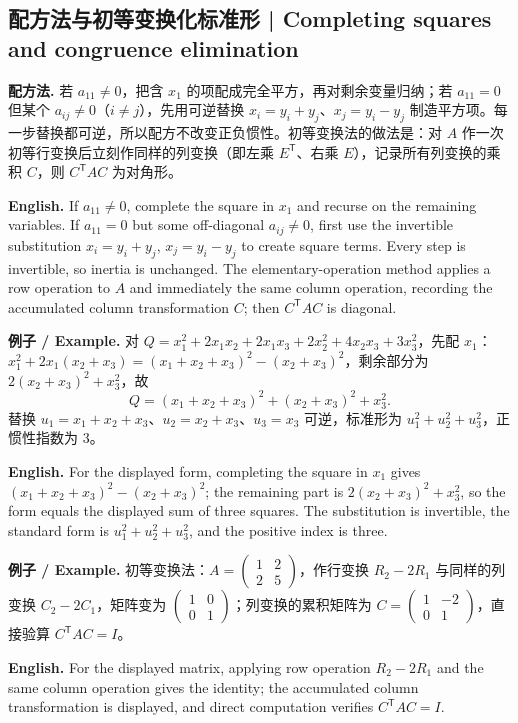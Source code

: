 \documentclass[UTF8,11pt,a4paper]{ctexart}
\newcommand{\EN}[1]{\par\noindent\textbf{English.} #1\par}
\newcommand{\EX}[2]{\par\noindent\textbf{例子 / Example.} #1\par\EN{#2}}
\begin{document}
\subsection{配方法与初等变换化标准形 | Completing squares and congruence elimination}
\noindent\textbf{配方法.} 若 $a_{11}\ne0$，把含 $x_1$ 的项配成完全平方，再对剩余变量归纳；若 $a_{11}=0$ 但某个 $a_{ij}\ne0$（$i\ne j$），先用可逆替换 $x_i=y_i+y_j$、$x_j=y_i-y_j$ 制造平方项。每一步替换都可逆，所以配方不改变正负惯性。初等变换法的做法是：对 $A$ 作一次初等行变换后立刻作同样的列变换（即左乘 $E^{\mathsf T}$、右乘 $E$），记录所有列变换的乘积 $C$，则 $C^{\mathsf T}AC$ 为对角形。
\EN{If $a_{11}\ne0$, complete the square in $x_1$ and recurse on the remaining variables. If $a_{11}=0$ but some off-diagonal $a_{ij}\ne0$, first use the invertible substitution $x_i=y_i+y_j$, $x_j=y_i-y_j$ to create square terms. Every step is invertible, so inertia is unchanged. The elementary-operation method applies a row operation to $A$ and immediately the same column operation, recording the accumulated column transformation $C$; then $C^{\mathsf T}AC$ is diagonal.}
\EX{对 $Q=x_1^2+2x_1x_2+2x_1x_3+2x_2^2+4x_2x_3+3x_3^2$，先配 $x_1$：$x_1^2+2x_1(x_2+x_3)=(x_1+x_2+x_3)^2-(x_2+x_3)^2$，剩余部分为 $2(x_2+x_3)^2+x_3^2$，故
\[
Q=(x_1+x_2+x_3)^2+(x_2+x_3)^2+x_3^2.
\]
替换 $u_1=x_1+x_2+x_3$、$u_2=x_2+x_3$、$u_3=x_3$ 可逆，标准形为 $u_1^2+u_2^2+u_3^2$，正惯性指数为 $3$。}{For the displayed form, completing the square in $x_1$ gives $(x_1+x_2+x_3)^2-(x_2+x_3)^2$; the remaining part is $2(x_2+x_3)^2+x_3^2$, so the form equals the displayed sum of three squares. The substitution is invertible, the standard form is $u_1^2+u_2^2+u_3^2$, and the positive index is three.}
\EX{初等变换法：$A=\begin{pmatrix}1&2\\2&5\end{pmatrix}$，作行变换 $R_2-2R_1$ 与同样的列变换 $C_2-2C_1$，矩阵变为 $\begin{pmatrix}1&0\\0&1\end{pmatrix}$；列变换的累积矩阵为 $C=\begin{pmatrix}1&-2\\0&1\end{pmatrix}$，直接验算 $C^{\mathsf T}AC=I$。}{For the displayed matrix, applying row operation $R_2-2R_1$ and the same column operation gives the identity; the accumulated column transformation is displayed, and direct computation verifies $C^{\mathsf T}AC=I$.}
\end{document}
